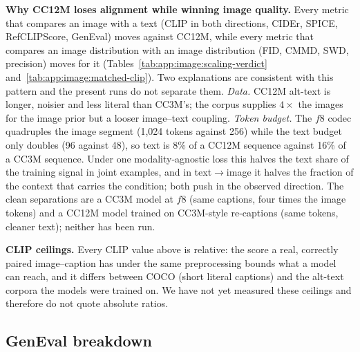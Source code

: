 \textbf{Why CC12M loses alignment while winning image quality.} Every metric that compares an image
with a text (CLIP in both directions, CIDEr, SPICE, RefCLIPScore, GenEval) moves against CC12M,
while every metric that compares an image distribution with an image distribution (FID, CMMD, SWD,
precision) moves for it (Tables~\ref{tab:app:image:scaling-verdict}
and~\ref{tab:app:image:matched-clip}). Two explanations are consistent with this pattern and the
present runs do not separate them. \emph{Data.} CC12M alt-text is longer, noisier and less literal
than CC3M's; the corpus supplies $4\times$ the images for the image prior but a looser image--text
coupling. \emph{Token budget.} The $f8$ codec quadruples the image segment (1{,}024 tokens against
256) while the text budget only doubles (96 against 48), so text is 8\% of a CC12M sequence against
16\% of a CC3M sequence. Under one modality-agnostic loss this halves the text share of the training
signal in joint examples, and in text$\rightarrow$image it halves the fraction of the context that
carries the condition; both push in the observed direction. The clean separations are a CC3M model at $f8$ (same captions, four times the
image tokens) and a CC12M model trained on CC3M-style re-captions (same tokens, cleaner text);
neither has been run.

\textbf{CLIP ceilings.} Every CLIP value above is relative: the score a real, correctly paired
image--caption has under the same preprocessing bounds what a model can reach, and it differs
between COCO (short literal captions) and the alt-text corpora the models were trained on. We
have not yet measured these ceilings and therefore do not quote absolute ratios.


\subsection{GenEval breakdown}
\label{app:image:geneval}

